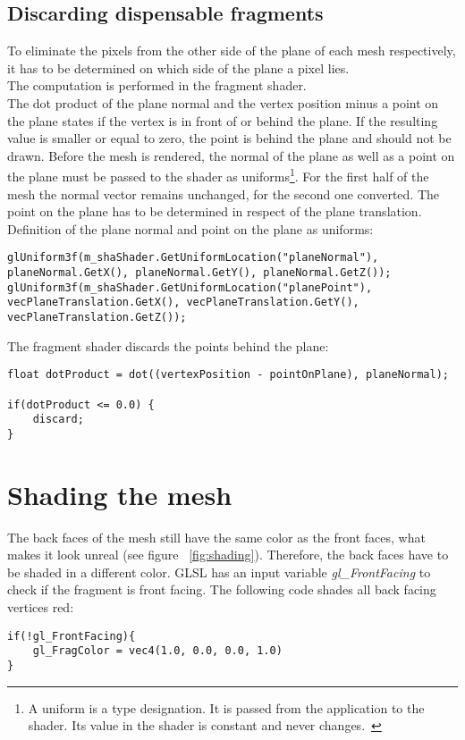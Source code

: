 \subsection{Discarding dispensable fragments}
To eliminate the pixels from the other side of the plane of each mesh respectively, it has to be determined on which side of the plane a pixel lies.\\
The computation is performed in the fragment shader.\\
The dot product of the plane normal and the vertex position minus a point on the plane states if the vertex is in front of or behind the plane. If the resulting value is smaller or equal to zero, the point is behind the plane and should not be drawn. Before the mesh is rendered, the normal of the plane as well as a point on the plane must be passed to the shader as uniforms\footnote{A uniform is a type designation. It is passed from the application to the shader. Its value in the shader is constant and never changes.~\cite{misc:glslTut}}. 
For the first half of the mesh the normal vector remains unchanged, for the second one converted. The point on the plane has to be determined in respect of the plane translation.\\
\newline
Definition of the plane normal and point on the plane as uniforms:
\begin{lstlisting}
glUniform3f(m_shaShader.GetUniformLocation("planeNormal"), planeNormal.GetX(), planeNormal.GetY(), planeNormal.GetZ());
glUniform3f(m_shaShader.GetUniformLocation("planePoint"), vecPlaneTranslation.GetX(), vecPlaneTranslation.GetY(), vecPlaneTranslation.GetZ());
\end{lstlisting}

The fragment shader discards the points behind the plane:
\begin{lstlisting}
float dotProduct = dot((vertexPosition - pointOnPlane), planeNormal);
		
if(dotProduct <= 0.0) {
	discard;
}
\end{lstlisting}

\section{Shading the mesh}
The back faces of the mesh still have the same color as the front faces, what makes it look unreal (see figure ~\ref{fig:shading}). Therefore, the back faces have to be shaded in a different color. GLSL has an input variable \emph{gl\_FrontFacing} to check if the fragment is front facing. The following code shades all back facing vertices red:
\begin{lstlisting}
if(!gl_FrontFacing){
	gl_FragColor = vec4(1.0, 0.0, 0.0, 1.0)
}
\end{lstlisting}


